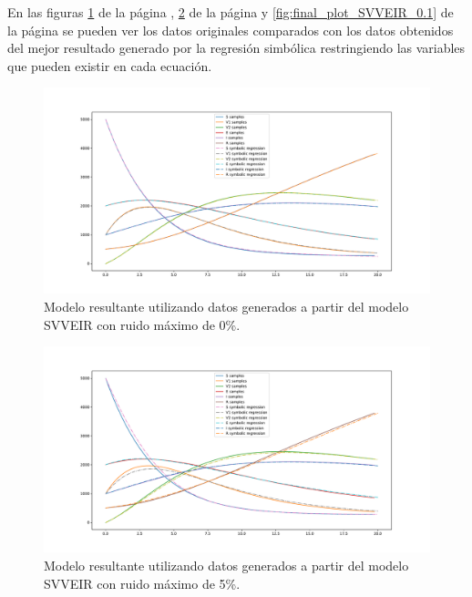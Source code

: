 En las figuras \ref{fig:final_plot_SVVEIR_0.0} de la página \pageref{fig:final_plot_SVVEIR_0.0}, \ref{fig:final_plot_SVVEIR_0.05} de la página \pageref{fig:final_plot_SVVEIR_0.05} y \ref{fig:final_plot_SVVEIR_0.1} de la página \pageref{fig:final_plot_SVVEIR_0.1} se pueden ver los datos originales comparados con los datos obtenidos del mejor resultado generado por la regresión simbólica restringiendo las variables que pueden existir en cada ecuación.

\begin{figure}[h]
    \centering
    \includegraphics[width=\textwidth]{"figures/final_plot_SVVEIR_0.0.pdf"}
    \caption{Modelo resultante utilizando datos generados a partir del modelo SVVEIR con ruido máximo de 0\%.}
    \label{fig:final_plot_SVVEIR_0.0}
\end{figure}

\begin{figure}[h]
    \centering
    \includegraphics[width=\textwidth]{"figures/final_plot_SVVEIR_0.05.pdf"}
    \caption{Modelo resultante utilizando datos generados a partir del modelo SVVEIR con ruido máximo de 5\%.}
    \label{fig:final_plot_SVVEIR_0.05}
\end{figure}

